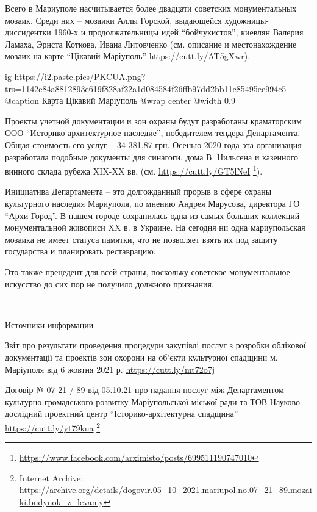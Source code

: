Всего в Мариуполе насчитывается более двадцати советских монументальных мозаик.
Среди них – мозаики Аллы Горской, выдающейся художницы-диссидентки 1960-х и
продолжательницы идей \enquote{бойчукистов}, киевлян Валерия Ламаха, Эрнста Коткова,
Ивана Литовченко (см. описание и местонахождение мозаик на карте \enquote{Цікавий
Маріуполь} \url{https://cutt.ly/AT5gXwr}). 

\ifcmt
	ig https://i2.paste.pics/PKCUA.png?trs=1142e84a8812893e619f828af22a1d084584f26ffb97dd2bb11c85495ee994c5
	@caption Карта Цікавий Маріуполь
  @wrap center
  @width 0.9
\fi

Проекты учетной документации и зон охраны будут разработаны краматорским ООО
\enquote{Историко-архитектурное наследие}, победителем тендера Департамента. Общая
стоимость его услуг – 34 381,87 грн. Осенью 2020 года эта организация
разработала подобные документы для синагоги, дома В. Нильсена и казенного
винного склада рубежа XIX-XX вв. (см. \url{https://cutt.ly/GT5lNeI}
\footnote{\url{https://www.facebook.com/arximisto/posts/699511190747010}}).

Инициатива Департамента – это долгожданный прорыв в сфере охраны культурного
наследия Мариуполя, по мнению Андрея Марусова, директора ГО \enquote{Архи-Город}. В
нашем городе сохранилась одна из самых больших коллекций монументальной
живописи XX в. в Украине. На сегодня ни одна мариупольская мозаика не имеет
статуса памятки, что не позволяет взять их под защиту государства и планировать
реставрацию. 

Это также прецедент для всей страны, поскольку советское монументальное
искусство до сих пор не получило должного признания.

=================

Источники информации 

Звіт про результати проведення процедури закупівлі послуг з розробки облікової
документації та проектів зон охорони на об'єкти культурної спадщини м.
Маріуполя від 6 жовтня 2021 р. \url{https://cutt.ly/mt72o7j}

Договір № 07-21 / 89 від 05.10.21 про надання послуг між Департаментом
культурно-громадського розвитку Маріупольської міської ради та ТОВ
Науково-дослідний проектний центр \enquote{Історико-архітектурна спадщина}
\url{https://cutt.ly/yt79kua}
\footnote{Internet Archive: \url{https://archive.org/details/dogovir.05_10_2021.mariupol.no.07_21_89.mozaiki.budynok_z_levamy}}
